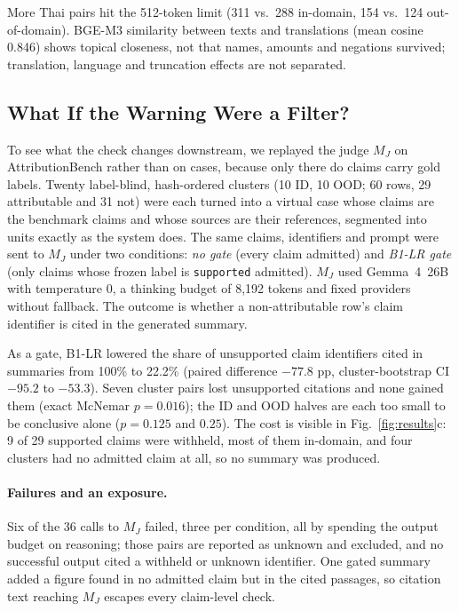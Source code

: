\documentclass[runningheads]{llncs}
\begin{document}
More Thai pairs hit the 512-token limit (311 vs.\ 288 in-domain, 154 vs.\ 124 out-of-domain).
BGE-M3 \cite{chen2024bgem3} similarity between texts and translations (mean cosine 0.846) shows topical
closeness, not that names, amounts and negations survived; translation, language and truncation effects
are not separated.

\subsection{What If the Warning Were a Filter?}\label{sec:replay}

To see what the check changes downstream, we replayed the judge $M_J$ on AttributionBench
rather than on cases, because only there do claims carry gold labels. Twenty label-blind,
hash-ordered clusters (10 ID, 10 OOD; 60 rows, 29 attributable and 31 not) were each turned into a
virtual case whose claims are the benchmark claims and whose sources are their references,
segmented into units exactly as the system does. The same claims, identifiers and prompt were sent
to $M_J$ under two conditions: \emph{no gate} (every claim admitted) and \emph{B1-LR gate}
(only claims whose frozen label is \texttt{supported} admitted). $M_J$ used Gemma~4~26B
with temperature 0, a thinking budget of 8,192 tokens and fixed providers without fallback. The
outcome is whether a non-attributable row's claim identifier is cited in the generated summary.


As a gate, B1-LR lowered the share of unsupported claim identifiers cited in summaries from
100\% to 22.2\% (paired difference $-77.8$ pp, cluster-bootstrap CI $-95.2$ to $-53.3$). Seven
cluster pairs lost unsupported citations and none gained them (exact McNemar $p=0.016$); the ID and
OOD halves are each too small to be conclusive alone ($p=0.125$ and $0.25$). The cost is visible in Fig.~\ref{fig:results}c: 9 of 29 supported claims were withheld, most of them in-domain, and four clusters
had no admitted claim at all, so no summary was produced.

\paragraph{Failures and an exposure.}
Six of the 36 calls to $M_J$ failed, three per condition, all by spending the output budget on
reasoning; those pairs are reported as unknown and excluded, and no successful output cited a withheld
or unknown identifier. One gated summary added a figure found in no admitted claim but in the cited passages, so citation text
reaching $M_J$ escapes every claim-level check.
\end{document}
